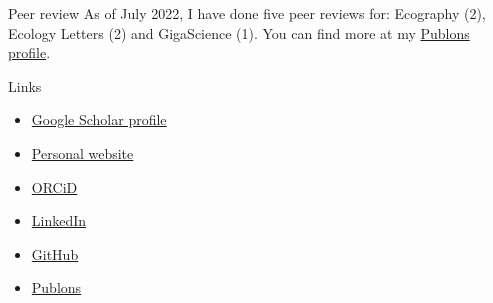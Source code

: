 \documentclass{resume} %
\begin{document}
\begin{rSection}{Peer review}
As of July 2022, I have done five peer reviews for: Ecography (2), Ecology Letters (2) and GigaScience (1). You can find more at my \href{https://publons.com/wos-op/researcher/4208953/emilio-berti/}{Publons profile}.
\end{rSection}

\begin{rSection}{Links}
\begin{minipage}{0.5\textwidth}
\begin{itemize}
    \item \href{https://scholar.google.com/citations?user=5KPh-oUAAAAJ&hl=en}{Google Scholar profile}
    \item \href{https://emilio-berti.github.io/}{Personal website}
    \item \href{https://orcid.org/0000-0001-9286-011X}{ORCiD}
\end{itemize}
\end{minipage}
\begin{minipage}{0.5\textwidth}
\begin{itemize}
    \item \href{https://www.linkedin.com/in/emilio-berti-55a348146}{LinkedIn}
    \item \href{https://github.com/emilio-berti}{GitHub}
    \item \href{https://publons.com/wos-op/researcher/4208953/emilio-berti/peer-review/}{Publons}
\end{itemize}
\end{minipage}
\end{rSection}
\end{document}

